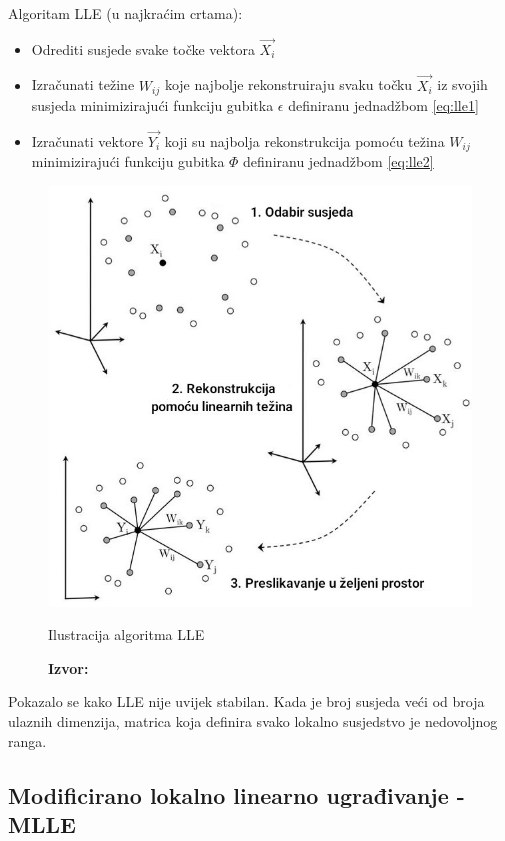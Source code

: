 \documentclass[times, utf8, diplomski]{fer}
\newcommand*{\captionsource}[2]{            %
    \RawFloats
    \caption{#1}
    \caption*{\textbf{Izvor:} #2}
}
\begin{document}
Algoritam LLE (u najkraćim crtama):
\begin{itemize}
    \item Odrediti susjede svake točke vektora $\vec{X_i}$
    \item Izračunati težine $W_{ij}$ koje najbolje rekonstruiraju svaku točku $\vec{X_i}$ iz svojih susjeda minimizirajući funkciju gubitka $\epsilon$ definiranu jednadžbom \ref{eq:lle1}
    \item Izračunati vektore $\vec{Y_i}$ koji su najbolja rekonstrukcija pomoću težina $W_{ij}$ minimizirajući funkciju gubitka $\Phi$ definiranu jednadžbom \ref{eq:lle2}
\end{itemize}

\begin{figure}[htb]
    \centering
    \includegraphics[width=12cm]{resources/images/reduction/lle_steps.jpg}
    \captionsource{Ilustracija algoritma LLE}{\cite{saul2003think}}
    \label{fig:lle_steps}
\end{figure}

Pokazalo se kako LLE nije uvijek stabilan. Kada je broj susjeda veći od broja ulaznih dimenzija, matrica koja definira svako lokalno susjedstvo je nedovoljnog ranga.
\newpage

\subsection{Modificirano lokalno linearno ugrađivanje - MLLE}
\end{document}
